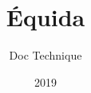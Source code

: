 \documentclass[report]{BetterDocument}
\title{Équida}
\subtitle{Doc Technique}
\date{2019}
\begin{document}
	\pageDeGarde

	\tableDesMatieres

	

	

	

	

	
\end{document}
